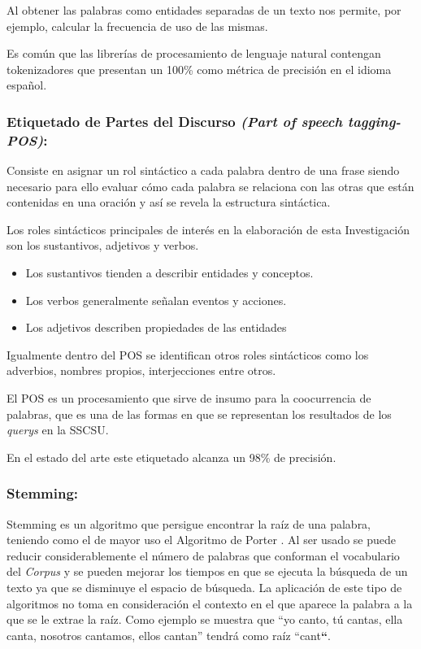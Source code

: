 \documentclass[
  10,
  openany]{book}
\begin{document}
Al obtener las palabras como entidades separadas de un texto nos permite, por ejemplo, calcular la frecuencia de uso de las mismas.

Es común que las librerías de procesamiento de lenguaje natural contengan tokenizadores que presentan un 100\% como métrica de precisión en el idioma español.

\hypertarget{pos}{%
\subsubsection{\texorpdfstring{Etiquetado de Partes del Discurso \emph{(Part of speech tagging-POS)}:}{Etiquetado de Partes del Discurso (Part of speech tagging-POS):}}\label{pos}}

Consiste en asignar un rol sintáctico a cada palabra dentro de una frase \citep{eisenstein2019} siendo necesario para ello evaluar cómo cada palabra se relaciona con las otras que están contenidas en una oración y así se revela la estructura sintáctica.

Los roles sintácticos principales de interés en la elaboración de esta Investigación son los sustantivos, adjetivos y verbos.

\begin{itemize}
\item
  Los sustantivos tienden a describir entidades y conceptos.
\item
  Los verbos generalmente señalan eventos y acciones.
\item
  Los adjetivos describen propiedades de las entidades
\end{itemize}

Igualmente dentro del POS se identifican otros roles sintácticos como los adverbios, nombres propios, interjecciones entre otros.

El POS es un procesamiento que sirve de insumo para la coocurrencia de palabras, que es una de las formas en que se representan los resultados de los \emph{querys} en la SSCSU.

En el estado del arte este etiquetado alcanza un 98\% de precisión.

\hypertarget{steaming}{%
\subsubsection{Stemming:}\label{steaming}}

Stemming es un algoritmo que persigue encontrar la raíz de una palabra, teniendo como el de mayor uso el Algoritmo de Porter \citep{willett2006}. Al ser usado se puede reducir considerablemente el número de palabras que conforman el vocabulario del \emph{Corpus} y se pueden mejorar los tiempos en que se ejecuta la búsqueda de un texto ya que se disminuye el espacio de búsqueda. La aplicación de este tipo de algoritmos no toma en consideración el contexto en el que aparece la palabra a la que se le extrae la raíz. Como ejemplo se muestra que ``yo canto, tú cantas, ella canta, nosotros cantamos, ellos cantan'' tendrá como raíz ``cant\textbf{``}.
\end{document}
